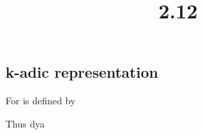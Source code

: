 \documentclass[
]{article}
\title{2.12}
\author{}
\date{}
\begin{document}
\maketitle

\subsection{k-adic representation}\label{k-adic-representation}

For {} is {} defined by

Thus dya {}
\end{document}
